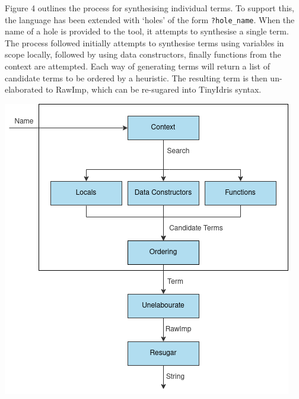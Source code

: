 \documentclass[a4paper]{article}
\newenvironment{Figure}
  {\par\medskip\noindent\minipage{\linewidth}}
  {\endminipage\par\medskip}
\begin{document}
Figure 4 outlines the process for synthesising individual terms.
To support this, the language has been extended with `holes' of
the form \texttt{?hole\_name}. When the name of a hole is provided to
the tool, it attempts to synthesise a single term. 
The process followed initially attempts to synthesise terms using variables in scope
locally, followed by using data constructors, finally functions from the
context are attempted. Each way of generating terms will return a list of candidate
terms to be ordered by a heuristic. The resulting term is then
un-elaborated to RawImp, which can be re-sugared into TinyIdris syntax.

\begin{multicols}{2}
\begin{Figure}
\centering
\includegraphics[scale=0.55]{./Resource/syn.png}
\end{Figure}


\end{multicols}
\end{document}
